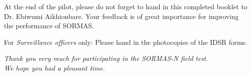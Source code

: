 \documentclass[a4paper, titlepage]{tufte-handout}
\begin{document}
\newpage
At the end of the pilot, please do not forget to hand in this completed booklet to Dr. Ebiwumi  Aikhionbare. Your feedback is of great importance for improving the performance of SORMAS.

For \emph{Surveillance officers} only: Please hand in the photocopies of the IDSR forms.

\vspace{4\baselineskip}

\begin{center}
\emph{Thank you very much for participating in the SORMAS-N field test.\\
We hope you had a pleasant time.}
\end{center}
\end{document}
